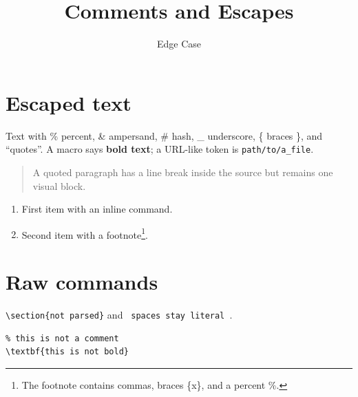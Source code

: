 \documentclass{article}
\title{Comments and Escapes}
\author{Edge Case}
\newcommand{\named}[1]{\textbf{#1}}
\begin{document}
\maketitle

\section{Escaped text}
Text with \% percent, \& ampersand, \# hash, \_ underscore, \{ braces \}, and ``quotes''.
A macro says \named{bold text}; a URL-like token is \texttt{path/to/a\_file}.

\begin{quote}
A quoted paragraph has a line break
inside the source but remains one visual block.
\end{quote}

\begin{enumerate}
\item First item with an inline command.
\item Second item with a footnote\footnote{The footnote contains commas, braces \{x\}, and a percent \%.}.
\end{enumerate}

\section{Raw commands}
\verb|\section{not parsed}| and \verb*| spaces stay literal |.
\begin{verbatim}
% this is not a comment
\textbf{this is not bold}
\end{verbatim}
\end{document}
